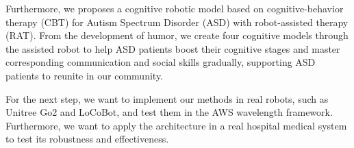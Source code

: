\documentclass[letterpaper]{article} %
\begin{document}
Furthermore, we proposes a cognitive robotic model based on cognitive-behavior therapy (CBT) for Autism Spectrum Disorder (ASD) with robot-assisted therapy (RAT). From the development of humor, we create four cognitive models through the assisted robot to help ASD patients boost their cognitive stages and master corresponding communication and social skills gradually, supporting ASD patients to reunite in our community. 

For the next step, we want to implement our methods in real robots, such as Unitree Go2 and LoCoBot, and test them in the AWS wavelength framework. 
Furthermore, we want to apply the architecture in a real hospital medical system to test its robustness and effectiveness.




\end{document}
